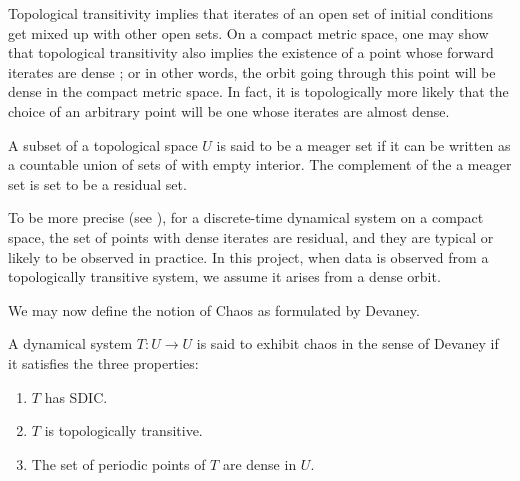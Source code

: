 Topological transitivity implies that iterates of an open set of initial conditions get mixed up with other open sets. On a compact metric space, one may show that topological transitivity also implies the existence of a point whose forward iterates are dense \cite{de2013elements}; or in other words, the orbit going through this point will be dense in the compact metric space. 
In fact, it is topologically more likely that the choice of an arbitrary point will be one whose iterates are almost dense. 

\begin{Definition}
  \label{Dfn_Meager Set}\rm
A subset of a topological space $U$ is said to be a meager set if it can be written as a countable union of sets of with empty interior. The complement of the a meager set is set to be a residual set.
\end{Definition}

To be more precise (see \cite{de2013elements}), for a discrete-time dynamical system on a compact space, the set of points with dense iterates are residual, and they are typical or likely to be observed in practice. In this project, when data is observed from a topologically transitive system, we assume it arises from a dense orbit.

We may now define the notion of Chaos as formulated by Devaney\cite{devaney2018introduction}.
\begin{Definition}
  \label{Dfn_ChaosDec}\rm
	A dynamical system $T: U \to U$ is said to exhibit chaos in the sense of Devaney if it satisfies the three properties:
	\vspace{-5mm}
  \begin{enumerate}
		\item $T$ has SDIC.
		\item $T$ is topologically transitive.
		\item The set of periodic points of $T$ are dense in $U$. 
	\end{enumerate}
\end{Definition}




